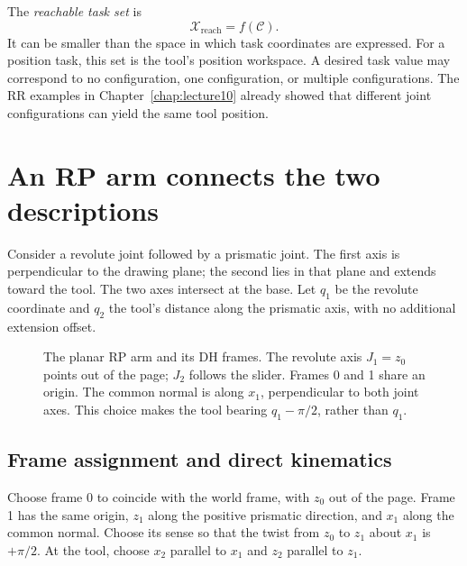 The \emph{reachable task set} is
\begin{equation}
 \mathcal X_{\mathrm{reach}}=f(\mathcal C).
 \label{eq:l11-reachable}
\end{equation}
It can be smaller than the space in which task coordinates are expressed.
For a position task, this set is the tool's position workspace. A desired
task value may correspond to no configuration, one configuration, or
multiple configurations. The RR examples in Chapter~\ref{chap:lecture10}
already showed that different joint configurations can yield the same
tool position.

\section{An RP arm connects the two descriptions}
\label{sec:l11-rp}
Consider a revolute joint followed by a prismatic joint. The first axis
is perpendicular to the drawing plane; the second lies in that plane and
extends toward the tool. The two axes intersect at the base. Let $q_1$
be the revolute coordinate and $q_2$ the tool's distance along the
prismatic axis, with no additional extension offset.

\begin{figure}[htbp]
\centering
\caption{The planar RP arm and its DH frames. The revolute axis $J_1=z_0$
points out of the page; $J_2$ follows the slider. Frames 0 and 1 share an
origin. The common normal is along $x_1$, perpendicular to both joint
axes. This choice makes the tool bearing $q_1-\pi/2$, rather than $q_1$.}
\label{fig:l11-rp}
\end{figure}

\subsection{Frame assignment and direct kinematics}
Choose frame 0 to coincide with the world frame, with $z_0$ out of the
page. Frame 1 has the same origin, $z_1$ along the positive prismatic
direction, and $x_1$ along the common normal. Choose its sense so that
the twist from $z_0$ to $z_1$ about $x_1$ is $+\pi/2$. At the tool,
choose $x_2$ parallel to $x_1$ and $z_2$ parallel to $z_1$.

